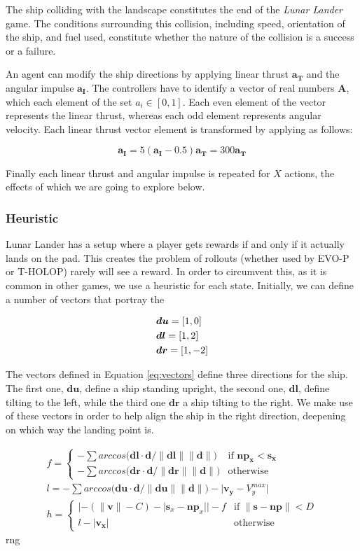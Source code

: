 \documentclass[conference]{IEEEtran}
\newcommand{\abs}[1]{\lvert#1\rvert}
\newcommand{\norm}[1]{\lVert#1\rVert}
\newcommand{\twopartdef}[4]
{
	\left\{
		\begin{array}{ll}
			#1 & \mbox{if } #2 \\
			#3 & \mbox{otherwise } 
		\end{array}
	\right.
}
\begin{document}
The ship colliding with the landscape constitutes the end of the {\itshape Lunar Lander} game. The conditions surrounding this collision, including speed, orientation of the ship, and fuel used, constitute whether the nature of the collision is a success or a failure.

An agent can modify the ship directions by applying linear thrust $\bm{a_T}$ and the angular impulse $\bm{a_I}$. The controllers have to identify a vector of real numbers $\bm{A}$, which each element of the set $a_i \in [0,1]$. Each even element of the vector represents the linear thrust, whereas each odd element represents angular velocity. Each linear thrust vector element is transformed by applying as follows: 

\begin{equation}
\bm{a_I} = 5(\bm{a_I} - 0.5)
\bm{a_T} = 300\bm{a_T} 
\end{equation}

Finally each linear thrust and angular impulse is repeated for $X$ actions, the effects of which we are going to explore below. 

\subsubsection{Heuristic} %

Lunar Lander has a setup where a player gets rewards if and only if it actually lands on the pad. This creates the problem of rollouts (whether used by EVO-P or T-HOLOP) rarely will see a reward. In order to circumvent this, as it is common in other games, we use a heuristic for each state. Initially, we can define a number of vectors that portray the 

\begin{align}
& \bm{du} = [1,0]\notag\\ 
& \bm{dl} = [1,2]\notag\\
& \bm{dr} = [1,-2]
\label{eq:vectors}
\end{align}


The vectors defined in Equation \ref{eq:vectors} define three directions for the ship. The first one, $\bm{du}$, define a ship standing upright, the second one, $\bm{dl}$, define tilting to the left, while the third one $\bm{dr}$ a ship tilting to the right. We make use of these vectors in order to help align the ship in the right direction, deepening on which way the landing point is. 


\begin{multline}
f = \twopartdef{-\sum{arccos(\bm{dl}\cdot\bm{d}/\norm{\bm{dl}}\norm{\bm{d}}})}{\bm{np_x} < \bm{s_x}}{-\sum{arccos(\bm{dr}\cdot\bm{d}/\norm{\bm{dr}}\norm{\bm{d}}})} {otherwise}\\
l = -\sum{arccos(\bm{du}\cdot\bm{d}/\norm{\bm{du}}\norm{\bm{d}}}) - \abs{\bm {v_y} - V_{y}^{max}} \\
h = \twopartdef{ \abs{-(\norm{\bm {v}} - C) - \abs{\bm {s}_{x} - \bm {np}_{x}}} - f}{\norm{\bm {s} - \bm {np}} < D}
{l - |\bm {v_x}|   }{Otherwise}
\label{eq:h1}
\end{multline}rng
\end{document}
